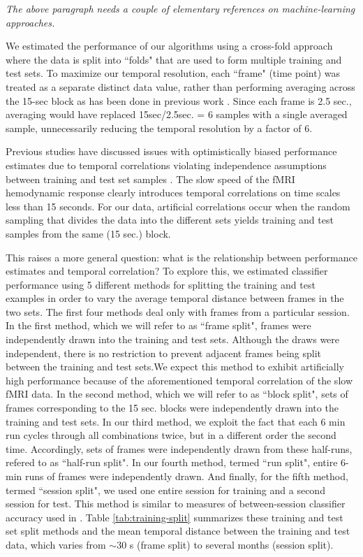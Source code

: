 \documentclass[preprint,5p,authoryear]{elsarticle}
\begin{document}
\emph{The above paragraph needs a couple of elementary references on machine-learning approaches.}

We estimated the performance of our algorithms using a cross-fold approach \citep{Kohavi1995} where the data is split into ``folds" that are used to form multiple training and test sets.
To maximize our temporal resolution, each ``frame" (time point) was treated as a separate distinct data value, rather than performing averaging across the 15-sec block as has been done in previous work \citep{BlockAveraging}.
Since each frame is 2.5 sec., averaging would have replaced 15sec/2.5sec. = 6 samples with a single averaged sample, unnecessarily reducing the temporal resolution by a factor of 6.


Previous studies have discussed issues with optimistically biased performance estimates due to temporal correlations violating independence assumptions between training and test set samples \citep{Pereira2009}. The slow speed of the fMRI hemodynamic response clearly introduces temporal correlations on time scales less than 15 seconds.
For our data, artificial correlations occur when the random sampling that divides the data into the different sets yields training and test samples from the same (15 sec.) block.

This raises a more general question: what is the relationship between performance estimates and temporal correlation?
To explore this, we estimated classifier performance using 5 different methods for splitting the training and test examples in order to vary the average temporal distance between frames in the two sets. 
The first four methods deal only with frames from a particular session.
In the first method, which we will refer to as  ``frame split", frames were independently drawn into the training and test sets. 
Although the draws were independent, there is no restriction to prevent adjacent frames being split between the training and test sets.We expect this method to exhibit artificially high performance because of the aforementioned temporal correlation of the slow fMRI data.
In the second method, which we will refer to as ``block split", sets of frames corresponding to the 15 sec. blocks were independently drawn into the training and test sets.
In our third method, we exploit the fact that each 6 min run cycles through all combinations twice, but in a different order the second time.
Accordingly, sets of frames were independently drawn from these half-runs, refered to as ``half-run split". 
In our fourth method, termed ``run split", entire 6-min runs of frames were independently drawn. 
And finally, for the fifth method, termed ``session split", we used one entire session for training and a second session for test.
This method is similar to measures of between-session classifier accuracy used in \citep{BetweenSessionAccuracy}.
Table \ref{tab:training-split} summarizes these training and test set split methods and the mean temporal distance between the training and test data, which varies from $\sim$30 s (frame split) to several months (session split).
\end{document}
